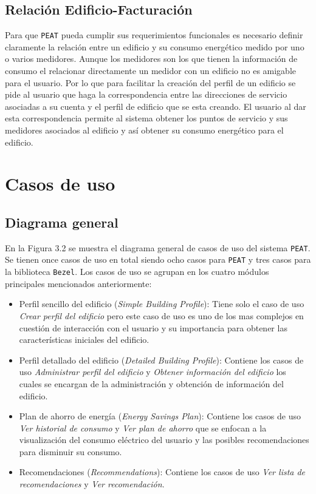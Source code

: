 
\subsection{Relación Edificio-Facturación}

Para que \texttt{PEAT} pueda cumplir sus requerimientos funcionales es necesario
definir claramente la relación entre un edificio y su consumo energético medido
por uno o varios medidores.
Aunque los medidores son los que tienen la información de consumo el relacionar
directamente un medidor con un edificio no es amigable para el usuario.
Por lo que para facilitar la creación del perfil de un edificio se pide al usuario
que haga la correspondencia entre las direcciones de servicio asociadas a su cuenta
y el perfil de edificio que se esta creando.
El usuario al dar esta correspondencia permite al sistema obtener los puntos
de servicio y sus medidores asociados al edificio y así obtener su consumo
energético para el edificio.

\section{Casos de uso}

\subsection{Diagrama general}

En la Figura 3.2 se muestra el diagrama general de casos de uso del sistema
\texttt{PEAT}. Se tienen once casos de uso en total siendo ocho casos para
\texttt{PEAT} y tres casos para la biblioteca \texttt{Bezel}.
Los casos de uso se agrupan en los cuatro módulos principales mencionados
anteriormente:

\begin{itemize}
\item Perfil sencillo del edificio (\textit{Simple Building Profile}): Tiene
  solo el caso de uso \textit{Crear perfil del edificio} pero este caso de uso
  es uno de los mas complejos en cuestión de interacción con el usuario y su
  importancia para obtener las características iniciales del edificio.
\item Perfil detallado del edificio (\textit{Detailed Building Profile}): Contiene
  los casos de uso \textit{Administrar perfil del edificio} y
  \textit{Obtener información del edificio} los cuales se encargan de la
  administración y obtención de información del edificio.
\item Plan de ahorro de energía (\textit{Energy Savings Plan}): Contiene los
  casos de uso \textit{Ver historial de consumo} y \textit{Ver plan de ahorro}
  que se enfocan a la visualización del consumo eléctrico del usuario y las
  posibles recomendaciones para disminuir su consumo.
\item Recomendaciones (\textit{Recommendations}): Contiene los casos de uso
  \textit{Ver lista de recomendaciones} y \textit{Ver recomendación}.
\end{itemize}


